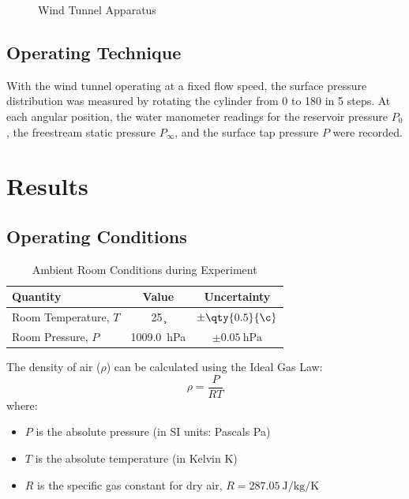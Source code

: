 \begin{figure}[H]
    \caption{Wind Tunnel Apparatus}
    \label{fig:procedures/apparatus/wind_tunnel}
\end{figure}

\subsection{Operating Technique} \label{sec:procedures/technique}

With the wind tunnel operating at a fixed flow speed, the surface pressure distribution was measured by rotating the cylinder from \qty{0}{\deg} to \qty{180}{\deg} in \qty{5}{\deg} steps. At each angular position, the water manometer readings for the reservoir pressure \(P_0\), the freestream static pressure \(P_{\infty}\), and the surface tap pressure \(P\) were recorded.

\section{Results} \label{sec:results}

\subsection{Operating Conditions} \label{sec:results/conditions}

\begin{table}[H]
    \centering
    \caption{Ambient Room Conditions during Experiment}
    \begin{tabular}{|l|c|c|}
        \hline
        Quantity                & Value              & Uncertainty                          \\ \hline \hline
        Room Temperature, \(T\) & \qty{25}{\c}       & \(\pm \qty{0.5}{\c}\)                \\
        Room Pressure, \(P\)    & \qty{1009.0}{\hecto\Pa} & \( \pm \qty{0.05}{\hecto\Pa} \) \\ \hline
    \end{tabular}
    \label{tab:ambient-conditions}
\end{table}

The density of air (\(\rho\)) can be calculated using the Ideal Gas Law:
\begin{equation}
    \rho = \frac{P}{R T}
\end{equation}
where:
\begin{itemize}
    \item \(P\) is the absolute pressure (in SI units: Pascals \unit{\Pa})
    \item \(T\) is the absolute temperature (in Kelvin \unit{\K})
    \item \(R\) is the specific gas constant for dry air, \(R = \qty{287.05}{\J\per\kg\per\K}\)
\end{itemize}

